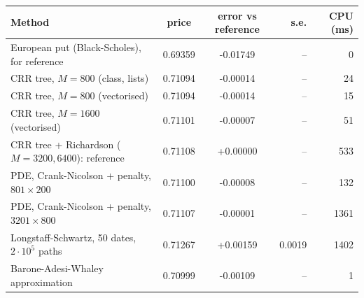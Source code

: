 \begin{tabular}{lccrr}
\toprule
Method & price & error vs reference & s.e. & CPU (ms) \\
\midrule
European put (Black-Scholes), for reference & 0.69359 & -0.01749 & -- & 0 \\
CRR tree, $M=800$ (class, lists) & 0.71094 & -0.00014 & -- & 24 \\
CRR tree, $M=800$ (vectorised) & 0.71094 & -0.00014 & -- & 15 \\
CRR tree, $M=1600$ (vectorised) & 0.71101 & -0.00007 & -- & 51 \\
CRR tree + Richardson ($M=3200,6400$): reference & 0.71108 & +0.00000 & -- & 533 \\
PDE, Crank-Nicolson + penalty, $801\times200$ & 0.71100 & -0.00008 & -- & 132 \\
PDE, Crank-Nicolson + penalty, $3201\times800$ & 0.71107 & -0.00001 & -- & 1361 \\
Longstaff-Schwartz, 50 dates, $2\cdot10^5$ paths & 0.71267 & +0.00159 & 0.0019 & 1402 \\
Barone-Adesi-Whaley approximation & 0.70999 & -0.00109 & -- & 1 \\
\bottomrule
\end{tabular}
